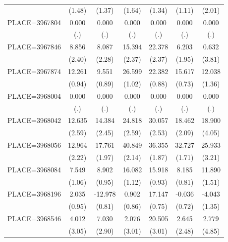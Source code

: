 {\begin{tabular}{l*{6}{c}}
                    &      (1.48)&      (1.37)&      (1.64)&      (1.34)&      (1.11)&      (2.01)\\
PLACE=3967804       &       0.000&       0.000&       0.000&       0.000&       0.000&       0.000\\
                    &         (.)&         (.)&         (.)&         (.)&         (.)&         (.)\\
PLACE=3967846       &       8.856&       8.087&      15.394&      22.378&       6.203&       0.632\\
                    &      (2.40)&      (2.28)&      (2.37)&      (2.37)&      (1.95)&      (3.81)\\
PLACE=3967874       &      12.261&       9.551&      26.599&      22.382&      15.617&      12.038\\
                    &      (0.94)&      (0.89)&      (1.02)&      (0.88)&      (0.73)&      (1.36)\\
PLACE=3968004       &       0.000&       0.000&       0.000&       0.000&       0.000&       0.000\\
                    &         (.)&         (.)&         (.)&         (.)&         (.)&         (.)\\
PLACE=3968042       &      12.635&      14.384&      24.818&      30.057&      18.462&      18.900\\
                    &      (2.59)&      (2.45)&      (2.59)&      (2.53)&      (2.09)&      (4.05)\\
PLACE=3968056       &      12.964&      17.761&      40.849&      36.355&      32.727&      25.933\\
                    &      (2.22)&      (1.97)&      (2.14)&      (1.87)&      (1.71)&      (3.21)\\
PLACE=3968084       &       7.549&       8.902&      16.082&      15.918&       8.185&      11.890\\
                    &      (1.06)&      (0.95)&      (1.12)&      (0.93)&      (0.81)&      (1.51)\\
PLACE=3968196       &       2.035&     -12.978&       0.902&      17.147&      -0.036&      -4.043\\
                    &      (0.95)&      (0.81)&      (0.86)&      (0.75)&      (0.72)&      (1.35)\\
PLACE=3968546       &       4.012&       7.030&       2.076&      20.505&       2.645&       2.779\\
                    &      (3.05)&      (2.90)&      (3.01)&      (3.01)&      (2.48)&      (4.85)\\

\end{tabular}}
